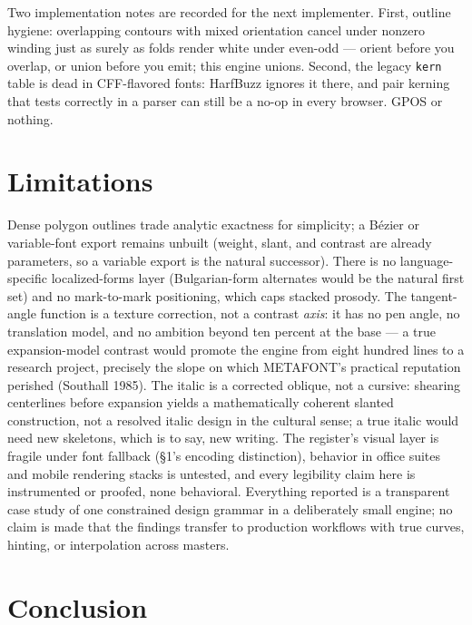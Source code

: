 \documentclass[11pt]{article}
\begin{document}
Two implementation notes are recorded for the next implementer. First, outline hygiene: overlapping contours with mixed orientation cancel under nonzero winding just as surely as folds render white under even-odd — orient before you overlap, or union before you emit; this engine unions. Second, the legacy \texttt{kern} table is dead in CFF-flavored fonts: HarfBuzz ignores it there, and pair kerning that tests correctly in a parser can still be a no-op in every browser. GPOS or nothing.

\section{Limitations}\label{sec:limits}

Dense polygon outlines trade analytic exactness for simplicity; a Bézier or variable-font export remains unbuilt (weight, slant, and contrast are already parameters, so a variable export is the natural successor). There is no language-specific localized-forms layer (Bulgarian-form alternates would be the natural first set) and no mark-to-mark positioning, which caps stacked prosody. The tangent-angle function is a texture correction, not a contrast \emph{axis}: it has no pen angle, no translation model, and no ambition beyond ten percent at the base — a true expansion-model contrast would promote the engine from eight hundred lines to a research project, precisely the slope on which METAFONT's practical reputation perished (Southall 1985). The italic is a corrected oblique, not a cursive: shearing centerlines before expansion yields a mathematically coherent slanted construction, not a resolved italic design in the cultural sense; a true italic would need new skeletons, which is to say, new writing. The register's visual layer is fragile under font fallback (\S1's encoding distinction), behavior in office suites and mobile rendering stacks is untested, and every legibility claim here is instrumented or proofed, none behavioral. Everything reported is a transparent case study of one constrained design grammar in a deliberately small engine; no claim is made that the findings transfer to production workflows with true curves, hinting, or interpolation across masters.

\section{Conclusion}
\end{document}
